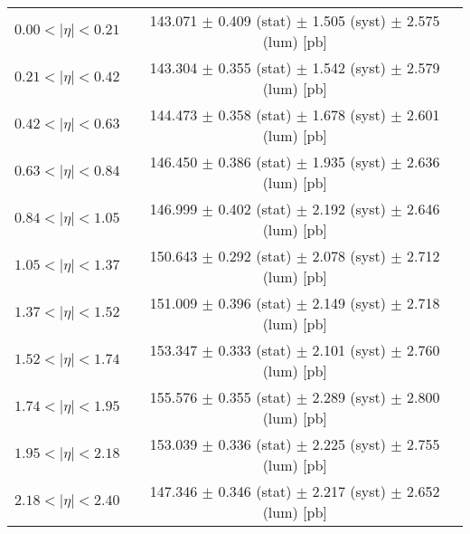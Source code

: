 \begin{tabular}{lc}
\hline
$0.00 < |\eta| <0.21$          & 143.071 $\pm$ 0.409 (stat) $\pm$ 1.505 (syst) $\pm$ 2.575 (lum) [pb]  \\
$0.21 < |\eta| <0.42$          & 143.304 $\pm$ 0.355 (stat) $\pm$ 1.542 (syst) $\pm$ 2.579 (lum) [pb]  \\
$0.42 < |\eta| <0.63$          & 144.473 $\pm$ 0.358 (stat) $\pm$ 1.678 (syst) $\pm$ 2.601 (lum) [pb]  \\
$0.63 < |\eta| <0.84$          & 146.450 $\pm$ 0.386 (stat) $\pm$ 1.935 (syst) $\pm$ 2.636 (lum) [pb]  \\
$0.84 < |\eta| <1.05$          & 146.999 $\pm$ 0.402 (stat) $\pm$ 2.192 (syst) $\pm$ 2.646 (lum) [pb]  \\
$1.05 < |\eta| <1.37$          & 150.643 $\pm$ 0.292 (stat) $\pm$ 2.078 (syst) $\pm$ 2.712 (lum) [pb]  \\
$1.37 < |\eta| <1.52$          & 151.009 $\pm$ 0.396 (stat) $\pm$ 2.149 (syst) $\pm$ 2.718 (lum) [pb]  \\
$1.52 < |\eta| <1.74$          & 153.347 $\pm$ 0.333 (stat) $\pm$ 2.101 (syst) $\pm$ 2.760 (lum) [pb]  \\
$1.74 < |\eta| <1.95$          & 155.576 $\pm$ 0.355 (stat) $\pm$ 2.289 (syst) $\pm$ 2.800 (lum) [pb]  \\
$1.95 < |\eta| <2.18$          & 153.039 $\pm$ 0.336 (stat) $\pm$ 2.225 (syst) $\pm$ 2.755 (lum) [pb]  \\
$2.18 < |\eta| <2.40$          & 147.346 $\pm$ 0.346 (stat) $\pm$ 2.217 (syst) $\pm$ 2.652 (lum) [pb]  \\
\hline
\end{tabular}
